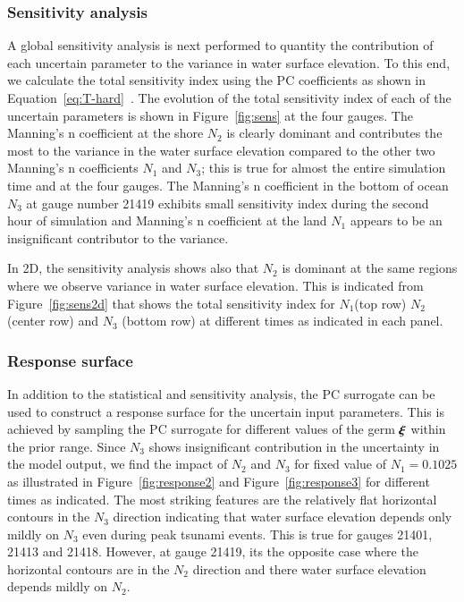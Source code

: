 \subsubsection{Sensitivity analysis}
A global sensitivity analysis is next performed to quantity the contribution of each
uncertain parameter to the variance in water surface elevation. To this end, we calculate 
the total sensitivity index using the PC coefficients as shown in Equation~\eqref{eq:T-hard}~\citep{Alexanderian2012,Sudret,Crestaux}. The evolution of the total sensitivity index
of each of the uncertain parameters is shown in Figure~\ref{fig:sens} at the four gauges. 
The Manning's n coefficient at the shore $N_2$ is clearly dominant and contributes
the most to the variance in the water surface elevation compared to the other two 
Manning's n coefficients $N_1$ and $N_3$; this is true for almost the entire simulation time
and at the four gauges. The Manning's n coefficient
in the bottom of ocean $N_{3}$ at gauge number 21419 exhibits small sensitivity index 
during the second hour of simulation and Manning's n coefficient
at the land $N_1$ appears to be an insignificant contributor
to the variance.

In 2D, the sensitivity analysis shows also that $N_2$ is dominant
at the same regions where we observe variance in water surface elevation. This is
indicated from Figure~\ref{fig:sens2d} that shows the total sensitivity index
for $N_1$(top row) $N_2$(center row) and $N_3$ (bottom row)
at different times as indicated in each panel.

\subsubsection{Response surface}
In addition to the statistical and sensitivity analysis, the PC surrogate 
can be used to construct a response surface for the uncertain input parameters.
This is achieved by sampling the PC surrogate for different values of the germ $\xxi$ within the prior
range. Since $N_3$ shows insignificant contribution in the 
uncertainty in the model output, we find the impact of $N_2$ and $N_3$ for 
fixed value of $N_1=0.1025$ as illustrated in Figure~\ref{fig:response2}
and Figure~\ref{fig:response3} for different times as indicated. The most striking features are the relatively flat
horizontal contours in the $N_3$ direction indicating that water surface elevation depends
only mildly on $N_3$ even during peak tsunami events. This is true for gauges 21401, 21413 and 21418. However,
at gauge 21419, its the opposite case where the horizontal contours are in the $N_2 $ direction
and there water surface elevation depends mildly on $N_2$.
